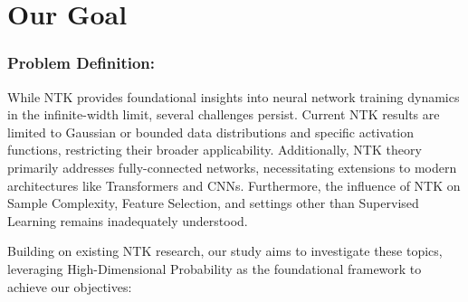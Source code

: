 \section{Our Goal}\label{sec:conclusion}

\subsubsection{Problem Definition:}
While NTK provides foundational insights into neural network training dynamics in the infinite-width limit, several challenges persist. Current NTK results are limited to Gaussian or bounded data distributions and specific activation functions, restricting their broader applicability. Additionally, NTK theory primarily addresses fully-connected networks, necessitating extensions to modern architectures like Transformers and CNNs. Furthermore, the influence of NTK on Sample Complexity, Feature Selection, and settings other than Supervised Learning remains inadequately understood.

Building on existing NTK research, our study aims to investigate these topics, leveraging High-Dimensional Probability as the foundational framework to achieve our objectives:

